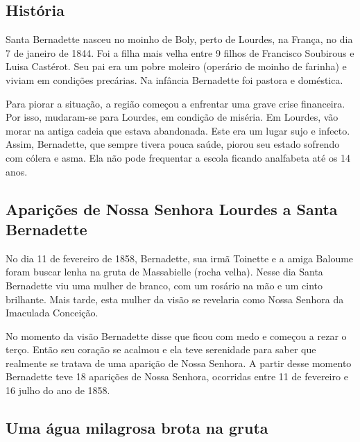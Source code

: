 \documentclass[18pt]{article}
\begin{document}
\begin{justify}

 \begin{center}
  \section{História}\label{sec:História} %
 \end{center}


Santa Bernadette nasceu no moinho de Boly, perto de Lourdes, na França, no dia 7 de janeiro de 1844. Foi a filha mais velha entre 9 filhos de Francisco Soubirous e Luisa Castérot. Seu pai era um pobre moleiro (operário de moinho de farinha) e viviam em condições precárias. Na infância Bernadette foi pastora e doméstica.

Para piorar a situação, a região começou a enfrentar uma grave crise financeira. Por isso, mudaram-se para Lourdes, em condição de miséria. Em Lourdes, vão morar na antiga cadeia que estava abandonada. Este era um lugar sujo e infecto. Assim, Bernadette, que sempre tivera pouca saúde, piorou seu estado sofrendo com cólera e asma. Ela não pode frequentar a escola ficando analfabeta até os 14 anos.


\begin{justify}
\subsection{ Aparições de Nossa Senhora Lourdes a Santa Bernadette }
\end{justify}

No dia 11 de fevereiro de 1858, Bernadette, sua irmã Toinette e a amiga Baloume foram buscar lenha na gruta de Massabielle (rocha velha). Nesse dia Santa Bernadette viu uma mulher de branco, com um rosário na mão e um cinto brilhante. Mais tarde, esta mulher da visão se revelaria como Nossa Senhora da Imaculada Conceição.

No momento da visão Bernadette disse que ficou com medo e começou a rezar o terço. Então seu coração se acalmou e ela teve serenidade para saber que realmente se tratava de uma aparição de Nossa Senhora. A partir desse momento Bernadette teve 18 aparições de Nossa Senhora, ocorridas entre 11 de fevereiro e 16 julho do ano de 1858.


\begin{justify}
\subsection{Uma água milagrosa brota na gruta}
\end{justify}


\end{justify}
\end{document}
